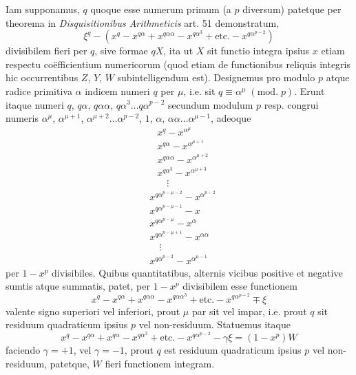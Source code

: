 \documentclass[twoside,12pt]{memoir}
\renewcommand{\pmod}[1]{\;(\textrm{mod.}\;#1)}
\begin{document}
Iam supponamus, \(q\) quoque esse numerum primum (a \(p\) diversum) patetque per theorema in \textit{Disquisitionibus Arithmeticis} art. 51 demonstratum,
\[\xi^{q}-(x^{q}-x^{q \alpha}+x^{q \alpha \alpha}-x^{q \alpha^{3}}+\text{etc.}-x^{q \alpha^{p-2}})\]
divisibilem fieri per \(q\), sive formae \(q X\), ita ut \(X\) sit functio integra ipsius \(x\) etiam respectu coëfficientium numericorum (quod etiam de functionibus reliquis integris hic occurrentibus \(Z\), \(Y\), \(W\) subintelligendum est). Designemus pro modulo \(p\) atque radice primitiva \(\alpha\) indicem numeri \(q\) per \(\mu\), i.e. sit \(q \equiv \alpha^{\mu}\pmod{p}\). Erunt itaque numeri \(q\), \(q \alpha\), \(q \alpha \alpha\), \(q \alpha^{3} \ldots q \alpha^{p-2}\) secundum modulum \(p\) resp. congrui numeris \(\alpha^{\mu}\), \(\alpha^{\mu+1}\), \(\alpha^{\mu+2} \ldots \alpha^{p-2}\), \(1\), \(\alpha\), \(\alpha \alpha \ldots \alpha^{\mu-1}\), adeoque
\[\begin{aligned}
&x^{q}-x^{\alpha^{\mu}} \\
&x^{q \alpha}-x^{\alpha^{\mu+1}} \\
&x^{q \alpha \alpha}-x^{\alpha^{\mu+2}} \\
&x^{q \alpha^{3}}-x^{\alpha^{\mu+3}}\\
&\quad \vdots \end{aligned}\]\pagebreak%
\[\begin{aligned}
&x^{q \alpha^{p-\mu-2}}-x^{\alpha^{p-2}}\\
&x^{q \alpha^{p-\mu-1}}-x\\
&x^{q \alpha^{p-\mu}}-x^{\alpha}\\
&x^{q \alpha^{p-\mu+1}}-x^{\alpha \alpha}\\
&\quad \vdots\\
&x^{q\alpha^{p-2}}-x^{\alpha^{\mu-1}}
\end{aligned}\]
per \(1-x^{p}\) divisibiles. Quibus quantitatibus, alternis vicibus positive et negative sumtis atque summatis, patet, per \(1-x^{p}\) divisibilem esse functionem
\[x^{q}-x^{q \alpha}+x^{q \alpha \alpha}-x^{q \alpha \alpha^{3}}+\text{etc.}-x^{q \alpha^{p-2}} \mp \xi\]
valente signo superiori vel inferiori, prout \(\mu\) par sit vel impar, i.e. prout \(q\) sit residuum quadraticum ipsius \(p\) vel non-residuum. Statuemus itaque
\[x^{q}-x^{q \alpha}+x^{q \alpha}-x^{q \alpha^{3}}+\text{etc.}-x^{q \alpha^{p-2}}-\gamma \xi=(1-x^{p}) W\]
faciendo \(\gamma=+1\), vel \(\gamma=-1\), prout \(q\) est residuum quadraticum ipsius \(p\) vel non-residuum, patetque, \(W\) fieri functionem integram.
\end{document}
